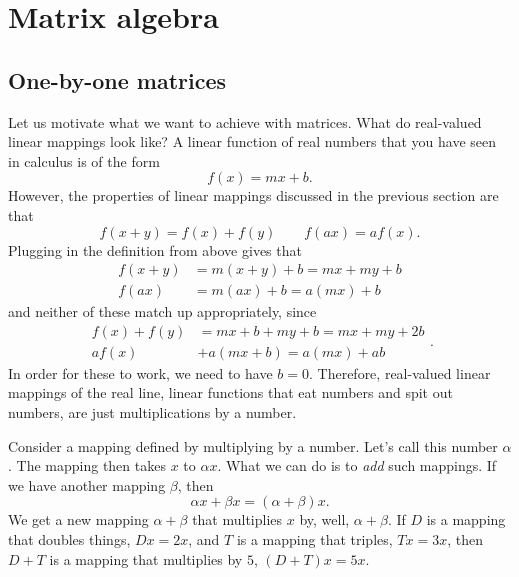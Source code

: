 
\section{Matrix algebra}
\label{matalg:section}



\subsection{One-by-one matrices}

Let us motivate what we want to achieve with matrices. What do real-valued linear mappings look like? A linear function 
of real numbers that you have seen in calculus is of the form
\[ f(x) = mx + b. \] However, the properties of linear mappings discussed in the previous section are that
\[ f(x+y) = f(x) + f(y) \qquad f(a x) = a f(x). \] Plugging in the definition from above gives that
\[ 
\begin{split}
f(x+y) &= m(x+y) + b = mx + my + b \\
f(ax) &= m(ax) + b = a(mx) + b
\end{split}
\]
and neither of these match up appropriately, since
\[
\begin{split}
f(x) + f(y) &= mx + b + my + b = mx + my + 2b \\
af(x) &+ a(mx + b) = a(mx) + ab
\end{split}.
\]
In order for these to work, we need to have $b=0$. Therefore, real-valued linear mappings of the real line, linear functions
that eat numbers and spit out numbers, are just multiplications by a
number.  

Consider a mapping defined by multiplying by a
number.  Let's call this number $\alpha$.   The mapping then takes $x$ to
$\alpha x$.  What we can do is
to \emph{add} such mappings.
If we have another mapping $\beta$, then
\begin{equation*}
\alpha x + \beta x = (\alpha + \beta) x .
\end{equation*}
We get a new mapping $\alpha+\beta$ that multiplies $x$ by, well,
$\alpha+\beta$.  If $D$ is a mapping that doubles things, 
$Dx = 2x$, and $T$ is a mapping that triples, $Tx = 3x$, then
$D+T$ is a mapping that multiplies by $5$, $(D+T)x = 5x$.

